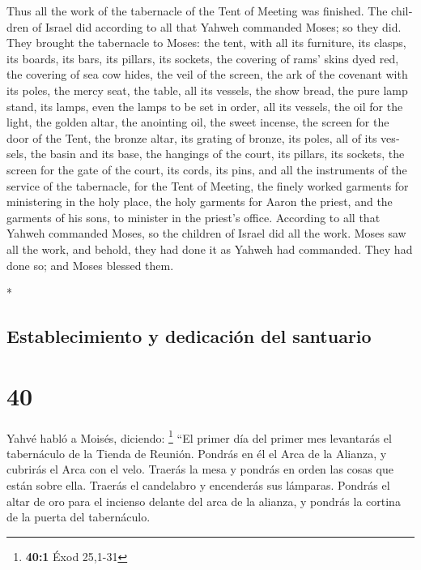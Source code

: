 \begin{paracol}{2}
\begin{otherlanguage}{english}
 Thus all the work of the tabernacle of the Tent of
Meeting was finished. The children of Israel did according to all that
Yahweh commanded Moses; so they did.  They brought the
tabernacle to Moses: the tent, with all its furniture, its clasps, its
boards, its bars, its pillars, its sockets,  the covering
of rams' skins dyed red, the covering of sea cow hides, the veil of the
screen,  the ark of the covenant with its poles, the
mercy seat,  the table, all its vessels, the show bread,
 the pure lamp stand, its lamps, even the lamps to be set
in order, all its vessels, the oil for the light,  the
golden altar, the anointing oil, the sweet incense, the screen for the
door of the Tent,  the bronze altar, its grating of
bronze, its poles, all of its vessels, the basin and its base,
 the hangings of the court, its pillars, its sockets, the
screen for the gate of the court, its cords, its pins, and all the
instruments of the service of the tabernacle, for the Tent of Meeting,
 the finely worked garments for ministering in the holy
place, the holy garments for Aaron the priest, and the garments of his
sons, to minister in the priest's office.  According to
all that Yahweh commanded Moses, so the children of Israel did all the
work.  Moses saw all the work, and behold, they had done
it as Yahweh had commanded. They had done so; and Moses blessed them.

\end{otherlanguage}

\switchcolumn[0]*

\hypertarget{establecimiento-y-dedicaciuxf3n-del-santuario}{%
\subsection{Establecimiento y dedicación del
santuario}\label{establecimiento-y-dedicaciuxf3n-del-santuario}}

\hypertarget{section-78}{%
\section{40}\label{section-78}}

 Yahvé habló a Moisés, diciendo: \footnote{\textbf{40:1}
  Éxod 25,1-31}  ``El primer día del primer mes levantarás
el tabernáculo de la Tienda de Reunión.  Pondrás en él el
Arca de la Alianza, y cubrirás el Arca con el velo. 
Traerás la mesa y pondrás en orden las cosas que están sobre ella.
Traerás el candelabro y encenderás sus lámparas.  Pondrás
el altar de oro para el incienso delante del arca de la alianza, y
pondrás la cortina de la puerta del tabernáculo.


\end{paracol}
